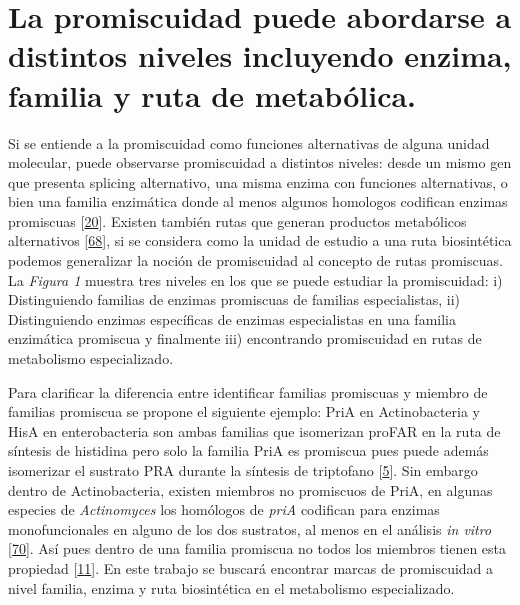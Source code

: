 \documentclass[12pt,twoside]{reedthesis}
\begin{document}
  \section{La promiscuidad puede abordarse a distintos niveles incluyendo
  enzima, familia y ruta de
  metabólica.}\label{la-promiscuidad-puede-abordarse-a-distintos-niveles-incluyendo-enzima-familia-y-ruta-de-metabolica.}
  
  Si se entiende a la promiscuidad como funciones alternativas de alguna
  unidad molecular, puede observarse promiscuidad a distintos niveles:
  desde un mismo gen que presenta splicing alternativo, una misma enzima
  con funciones alternativas, o bien una familia enzimática donde al menos
  algunos homologos codifican enzimas promiscuas
  {[}\protect\hyperlink{ref-nobeli_protein_2009}{20}{]}. Existen también
  rutas que generan productos metabólicos alternativos
  {[}\protect\hyperlink{ref-lamble_archaea_promiscuou_pathways_2003}{68}{]},
  si se considera como la unidad de estudio a una ruta biosintética
  podemos generalizar la noción de promiscuidad al concepto de rutas
  promiscuas. La \emph{Figura 1} muestra tres niveles en los que se puede
  estudiar la promiscuidad: i) Distinguiendo familias de enzimas
  promiscuas de familias especialistas, ii) Distinguiendo enzimas
  específicas de enzimas especialistas en una familia enzimática promiscua
  y finalmente iii) encontrando promiscuidad en rutas de metabolismo
  especializado.
  
  Para clarificar la diferencia entre identificar familias promiscuas y
  miembro de familias promiscua se propone el siguiente ejemplo: PriA en
  Actinobacteria y HisA en enterobacteria son ambas familias que
  isomerizan proFAR en la ruta de síntesis de histidina pero solo la
  familia PriA es promiscua pues puede además isomerizar el sustrato PRA
  durante la síntesis de triptofano
  {[}\protect\hyperlink{ref-baronagomez_occurrence_2003}{5}{]}. Sin
  embargo dentro de Actinobacteria, existen miembros no promiscuos de
  PriA, en algunas especies de \emph{Actinomyces} los homólogos de
  \emph{priA} codifican para enzimas monofuncionales en alguno de los dos
  sustratos, al menos en el análisis \emph{in vitro}
  {[}\protect\hyperlink{ref-juarez-vazquez_evolution_2017}{70}{]}. Así
  pues dentro de una familia promiscua no todos los miembros tienen esta
  propiedad {[}\protect\hyperlink{ref-bloom_neutral_2007}{11}{]}. En este
  trabajo se buscará encontrar marcas de promiscuidad a nivel familia,
  enzima y ruta biosintética en el metabolismo especializado.
  
\end{document}
